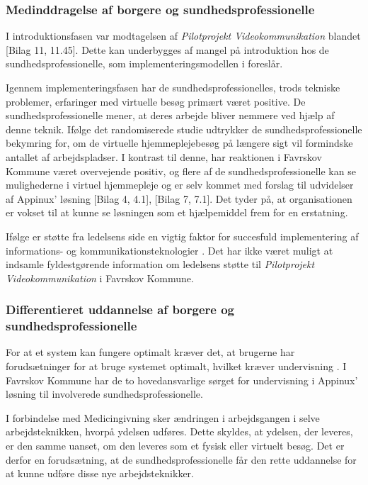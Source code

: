 \subsubsection{Medinddragelse af borgere og sundhedsprofessionelle}
I introduktionsfasen var modtagelsen af \textit{Pilotprojekt Videokommunikation} blandet [Bilag 11, 11.45]. Dette kan underbygges af mangel på introduktion hos de sundhedsprofessionelle, som implementeringsmodellen i  foreslår. 

Igennem implementeringsfasen har de sundhedsprofessionelles, trods tekniske problemer, erfaringer med virtuelle besøg primært været positive. De sundhedsprofessionelle mener, at deres arbejde bliver nemmere ved hjælp af denne teknik. Ifølge det randomiserede studie  udtrykker de sundhedsprofessionelle bekymring for, om de virtuelle hjemmeplejebesøg på længere sigt vil formindske antallet af arbejdspladser. I kontrast til denne, har reaktionen i Favrskov Kommune været overvejende positiv, og flere af de sundhedsprofessionelle kan se mulighederne i virtuel hjemmepleje og er selv kommet med forslag til udvidelser af Appinux' løsning [Bilag 4, 4.1], [Bilag 7, 7.1]. Det tyder på, at organisationen er vokset til at kunne se løsningen som et hjælpemiddel frem for en erstatning.

Ifølge  er støtte fra ledelsens side en vigtig faktor for succesfuld implementering af informations- og kommunikationsteknologier \cite{Ikt}. Det har ikke været muligt at indsamle fyldestgørende information om ledelsens støtte til \textit{Pilotprojekt Videokommunikation} i Favrskov Kommune. 

\subsubsection{Differentieret uddannelse af borgere og sundhedsprofessionelle}
For at et system kan fungere optimalt kræver det, at brugerne har forudsætninger for at bruge systemet optimalt, hvilket kræver undervisning \cite{Ikt}. I Favrskov Kommune har de to hovedansvarlige sørget for undervisning i Appinux' løsning til involverede sundhedsprofessionelle. 

I forbindelse med Medicingivning sker ændringen i arbejdsgangen i selve arbejdsteknikken, hvorpå ydelsen udføres. Dette skyldes, at ydelsen, der leveres, er den samme uanset, om den leveres som et fysisk eller virtuelt besøg. Det er derfor en forudsætning, at de sundhedsprofessionelle får den rette uddannelse for at kunne udføre disse nye arbejdsteknikker.  

